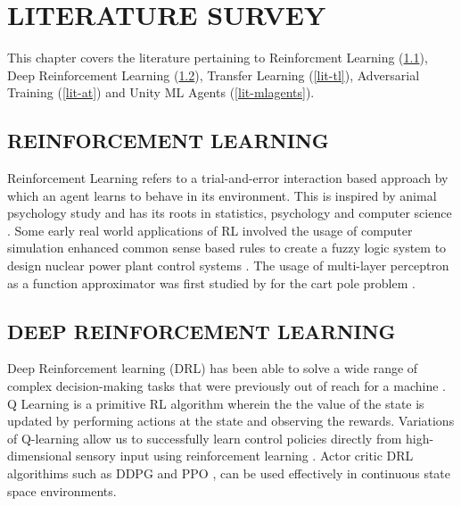 
\chapter{LITERATURE SURVEY} %

This chapter covers the literature pertaining to Reinforcment Learning (\ref{lit-rl}), Deep Reinforcement Learning (\ref{lit-drl}), Transfer Learning (\ref{lit-tl}), Adversarial Training (\ref{lit-at}) and Unity ML Agents (\ref{lit-mlagents}).

\section{REINFORCEMENT LEARNING} \label{lit-rl}

Reinforcement Learning refers to a trial-and-error interaction based approach by which an agent learns to behave in its environment. This is inspired by animal psychology study and has its roots in statistics, psychology and computer science \cite{RLIntro}. Some early real world applications of RL involved the usage of computer simulation enhanced common sense based rules to create a fuzzy logic system to design nuclear power plant control systems \cite{RLNuke}. The usage of multi-layer perceptron as a function approximator was first studied by \cite{RLMLP} for the cart pole problem \cite{RLCartPole}.

\section{DEEP REINFORCEMENT LEARNING} \label{lit-drl}

Deep Reinforcement learning (DRL) has been able to solve a wide range of complex decision-making tasks that were previously out of reach for a machine \cite{DRL2}. Q Learning \cite{Qlearn} is a primitive RL algorithm wherein the the value of the state is updated by performing actions at the state and observing the rewards. Variations of Q-learning allow us to successfully learn control policies directly from high-dimensional sensory input using reinforcement learning \cite{DRL1}. Actor critic DRL algorithims such as DDPG \cite{cont-ddpg} and PPO \cite{ppo}, can be used effectively in continuous state space environments.

